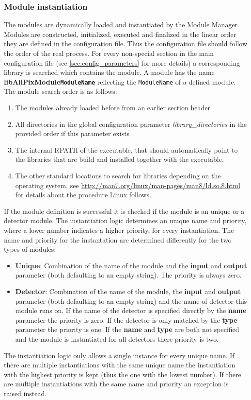 \subsubsection{Module instantiation}
\label{sec:module_instantiation}
The modules are dynamically loaded and instantiated by the Module Manager. Modules are constructed, initialized, executed and finalized in the linear order they are defined in the configuration file. Thus the configuration file should follow the order of the real process. For every non-special section in the main configuration file (see \ref{sec:config_parameters} for more details) a corresponding library is searched which contains the module. A module has the name \textbf{libAllPixModule\texttt{ModuleName}} reflecting the \texttt{ModuleName} of a defined module. The module search order is as follows:
\begin{enumerate}
\item The modules already loaded before from an earlier section header
\item All directories in the global configuration parameter \textit{library\_directories} in the provided order if this parameter exists
\item The internal RPATH of the executable, that should automatically point to the libraries that are build and installed together with the executable.
\item The other standard locations to search for libraries depending on the operating system, see \url{http://man7.org/linux/man-pages/man8/ld.so.8.html} for details about the procedure Linux follows.
\end{enumerate}

If the module definition is successful it is checked if the module is an unique or a detector module. The instantiation logic determines an unique name and priority, where a lower number indicates a higher priority, for every instantiation. The name and priority for the instantation are determined differently for the two types of modules:
\begin{itemize}
\item \textbf{Unique}: Combination of the name of the module and the \textbf{input} and \textbf{output} parameter (both defaulting to an empty string). The priority is always zero.
\item \textbf{Detector}: Combination of the name of the module, the \textbf{input} and \textbf{output} parameter (both defaulting to an empty string) and the name of detector this module runs on. If the name of the detector is specified directly by the \textbf{name} parameter the priority is zero. If the detector is only matched by the \textbf{type} parameter the priority is one. If the \textbf{name} and \textbf{type} are both not specified and the module is instantiated for all detectors there priority is two.
\end{itemize}
The instantiation logic only allows a single instance for every unique name. If there are multiple instantiations with the same unique name the instantiation with the highest priority is kept (thus the one with the lowest number). If there are multiple instantiations with the same name and priority an exception is raised instead.

